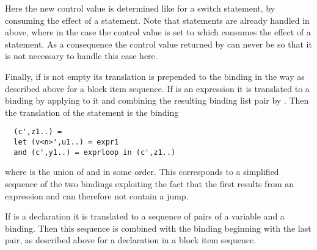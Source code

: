 Here the new control value is determined like for a switch statement, by consuming the effect of a  statement. Note that
 statements are already handled in  above, where in the  case the control
value is set to  which consumes the effect of a  statement. As a consequence the control value returned by
 can never be  so that it is not necessary to handle this case here.

Finally, if  is not empty its translation is prepended to the binding  in the way as described 
above for a block item sequence. If  is an expression it is translated to a binding  by 
applying  to it and 
combining the resulting binding list pair by . Then the translation of the  statement is the binding
\begin{verbatim}
  (c',z1..) = 
  let (v<n>',u1..) = expr1
  and (c',y1..) = exprloop in (c',z1..)
\end{verbatim}
where  is the union of  and  in some order. This corresponds to a simplified sequence of the two 
bindings exploiting the fact that the first results from an expression and can therefore not contain a jump.

If  is a declaration it is translated to a sequence of pairs of a variable and a binding. Then this sequence is combined
with the binding  beginning with the last pair, as described above for a declaration in a block item
sequence.

